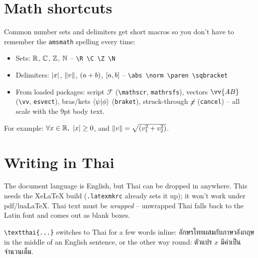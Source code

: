 \documentclass[a4paper, 10pt]{article}
\begin{document}
\subject
{}

\tableofcontents

\section{Math shortcuts}
Common number sets and delimiters get short macros so you don't have to
remember the \texttt{amsmath} spelling every time:
\begin{itemize}
	\item Sets: $\mathbb{R}$, $\mathbb{C}$, $\mathbb{Z}$, $\mathbb{N}$ -- \verb|\R \C \Z \N|
	\item Delimiters: $\left|x\right|$, $\left\lVert v\right\rVert$, $\left(a+b\right)$, $\left[a,b\right]$ --
	      \verb|\abs \norm \paren \sqbracket|
	\item From loaded packages: script $\mathscr{F}$ (\verb|\mathscr|,
	      \texttt{mathrsfs}), vectors $\vv{AB}$ (\verb|\vv|, \texttt{esvect}),
	      bras/kets $\braket{\psi|\phi}$ (\texttt{braket}), struck-through
	      $\cancel{x}$ (\texttt{cancel}) -- all scale with the 9pt body text.
\end{itemize}
For example: $\forall x \in \mathbb{R},\ \left|x\right| \geq 0$, and
$\left\lVert v\right\rVert = \sqrt{\left(v_1^2 + v_2^2\right)}$.

\section{Writing in Thai}
The document language is English, but Thai can be dropped in anywhere. This
needs the XeLaTeX build (\texttt{.latexmkrc} already sets it up); it won't
work under pdf/lua\LaTeX. Thai text must be \emph{wrapped} -- unwrapped Thai
falls back to the Latin font and comes out as blank boxes.

\verb|\textthai{...}| switches to Thai for a few words inline:
\textthai{อักษรไทยผสมกับภาษาอังกฤษ} in the middle of an English sentence, or the
other way round: \textthai{ตัวแปร} \(x\) \textthai{มีค่าเป็นจำนวนเต็ม}.
\end{document}
